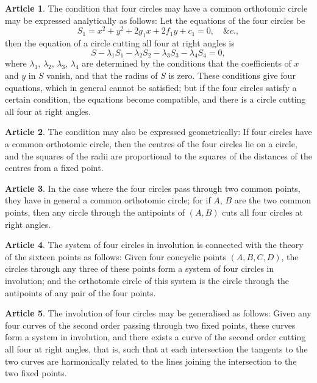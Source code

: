 \documentclass[11pt,a4paper]{article}
\theoremstyle{definition}
\newtheorem{art}{Article}
\begin{document}
\begin{art}
The condition that four circles may have a common orthotomic circle may be expressed analytically as follows: Let the equations of the four circles be
\[
S_{1} = x^{2} + y^{2} + 2g_{1}x + 2f_{1}y + c_{1} = 0, \quad \&c.,
\]
then the equation of a circle cutting all four at right angles is
\[
S - \lambda_{1}S_{1} - \lambda_{2}S_{2} - \lambda_{3}S_{3} - \lambda_{4}S_{4} = 0,
\]
where $\lambda_{1}$, $\lambda_{2}$, $\lambda_{3}$, $\lambda_{4}$ are determined by the conditions that the coefficients of $x$ and $y$ in $S$ vanish, and that the radius of $S$ is zero. These conditions give four equations, which in general cannot be satisfied; but if the four circles satisfy a certain condition, the equations become compatible, and there is a circle cutting all four at right angles.
\end{art}

\begin{art}
The condition may also be expressed geometrically: If four circles have a common orthotomic circle, then the centres of the four circles lie on a circle, and the squares of the radii are proportional to the squares of the distances of the centres from a fixed point.
\end{art}

\begin{art}
In the case where the four circles pass through two common points, they have in general a common orthotomic circle; for if $A$, $B$ are the two common points, then any circle through the antipoints of $(A, B)$ cuts all four circles at right angles.
\end{art}

\begin{art}
The system of four circles in involution is connected with the theory of the sixteen points as follows: Given four concyclic points $(A, B, C, D)$, the circles through any three of these points form a system of four circles in involution; and the orthotomic circle of this system is the circle through the antipoints of any pair of the four points.
\end{art}

\begin{art}
The involution of four circles may be generalised as follows: Given any four curves of the second order passing through two fixed points, these curves form a system in involution, and there exists a curve of the second order cutting all four at right angles, that is, such that at each intersection the tangents to the two curves are harmonically related to the lines joining the intersection to the two fixed points.
\end{art}
\end{document}
